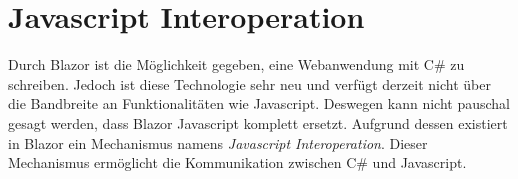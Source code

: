 \section{Javascript Interoperation}
\label{subsec:jsInteroperation}
Durch Blazor ist die Möglichkeit gegeben, eine Webanwendung mit C\# zu
schreiben. Jedoch ist diese Technologie sehr neu und verfügt derzeit nicht über die
Bandbreite an Funktionalitäten wie Javascript. Deswegen kann nicht pauschal gesagt
werden, dass Blazor Javascript komplett ersetzt. Aufgrund dessen existiert in Blazor ein
Mechanismus namens \emph{Javascript Interoperation}. Dieser Mechanismus ermöglicht die
Kommunikation zwischen C\# und Javascript.


